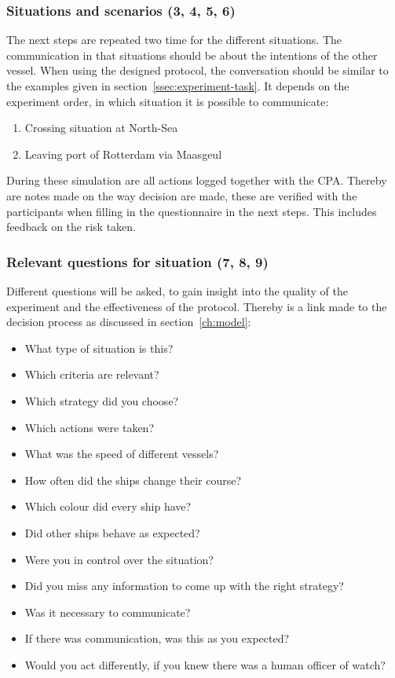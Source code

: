 \subsubsection{Situations and scenarios (3, 4, 5, 6)}
The next steps are repeated two time for the different situations. The communication in that situations should be about the intentions of the other vessel. When using the designed protocol, the conversation should be similar to the examples given in section~\ref{ssec:experiment-task}. It depends on the experiment order, in which situation it is possible to communicate:
\begin{spacing}{.9}
	\begin{enumerate}
		\item Crossing situation at North-Sea
		\item Leaving port of Rotterdam via Maasgeul
	\end{enumerate}
\end{spacing}
During these simulation are all actions logged together with the \ac{CPA}. Thereby are notes made on the way decision are made, these are verified with the participants when filling in the questionnaire in the next steps. This includes feedback on the risk taken.

\subsubsection{Relevant questions for situation (7, 8, 9)}
Different questions will be asked, to gain insight into the quality of the experiment and the effectiveness of the protocol. Thereby is a link made to the decision process as discussed in section~\ref{ch:model}:
\begin{spacing}{.9}
	\begin{itemize}
		\item What type of situation is this? \SA
		\item Which criteria are relevant? \performance
		\item Which strategy did you choose? \performance
		\item Which actions were taken? \performance
		\item What was the speed of different vessels? \SA
		\item How often did the ships change their course? \SA
		\item Which colour did every ship have? \SA
		\item Did other ships behave as expected? \SA \performance
		\item Were you in control over the situation? \performance \trust \satisfaction
		\item Did you miss any information to come up with the right strategy? \protocol \satisfaction
		\item Was it necessary to communicate? \SA \trust
		\item If there was communication, was this as you expected? \satisfaction
		\item Would you act differently, if you knew there was a human officer of watch? \trust \satisfaction
	\end{itemize}
\end{spacing}

